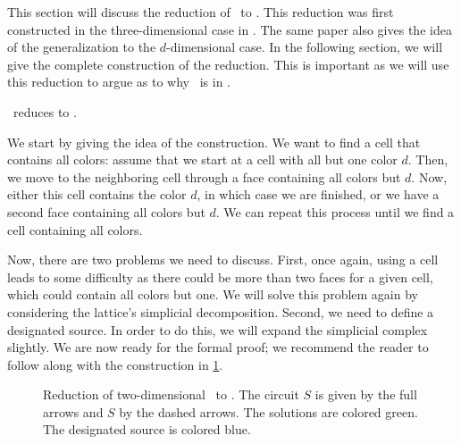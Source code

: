 This section will discuss the reduction of \Sperner\ to \EndOfLine. This reduction was first constructed in the three-dimensional case in . The same paper also gives the idea of the generalization to the $d$-dimensional case. In the following section, we will give the complete construction of the reduction. This is important as we will use this reduction to argue as to why \Tarskistar\ is in \EOPL.

\begin{theorem}
	\Sperner\ reduces to \EndOfLine.
\end{theorem}

We start by giving the idea of the construction. We want to find a cell that contains all colors: assume that we start at a cell with all but one color $d$. Then, we move to the neighboring cell through a face containing all colors but $d$. Now, either this cell contains the color $d$, in which case we are finished, or we have a second face containing all colors but $d$. We can repeat this process until we find a cell containing all colors.


Now, there are two problems we need to discuss. First, once again, using a cell leads to some difficulty as there could be more than two faces for a given cell, which could contain all colors but one. We will solve this problem again by considering the lattice's simplicial decomposition. Second, we need to define a designated source. In order to do this, we will expand the simplicial complex slightly. We are now ready for the formal proof; we recommend the reader to follow along with the construction in \cref{fig:sperner_eol_reduction}.

\begin{figure}
	\centering
	\caption[Reduction of \Sperner\ to \EndOfLine]{Reduction of two-dimensional \Sperner\ to \EndOfLine. The circuit $S$ is given by the full arrows and $S$ by the dashed arrows. The solutions are colored green. The designated source is colored blue.}
	\label{fig:sperner_eol_reduction}
\end{figure}


